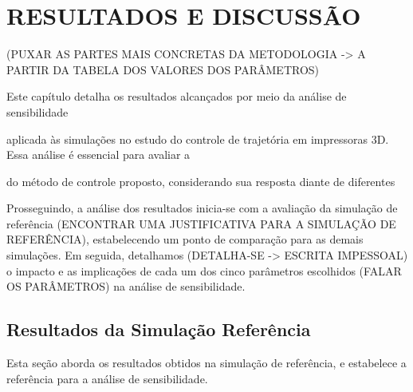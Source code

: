 \chapter{RESULTADOS E DISCUSSÃO}

(PUXAR AS PARTES MAIS CONCRETAS DA METODOLOGIA -> A PARTIR DA TABELA DOS VALORES DOS PARÂMETROS)




Este capítulo detalha os resultados alcançados por meio da análise de sensibilidade


aplicada às simulações no estudo do controle de trajetória em impressoras 3D. Essa análise é essencial para avaliar a 




do método de controle proposto, considerando sua resposta diante de diferentes 



Prosseguindo, a análise dos resultados inicia-se com a avaliação da simulação de referência (ENCONTRAR UMA JUSTIFICATIVA PARA A SIMULAÇÃO DE REFERÊNCIA), estabelecendo um ponto de comparação para as demais simulações. Em seguida, detalhamos (DETALHA-SE -> ESCRITA IMPESSOAL) o impacto e as implicações de cada um dos cinco parâmetros escolhidos (FALAR OS PARÂMETROS) na análise de sensibilidade.  


\section{Resultados da Simulação Referência}
Esta seção aborda os resultados obtidos na simulação de referência, e estabelece a referência para a análise de sensibilidade. 




